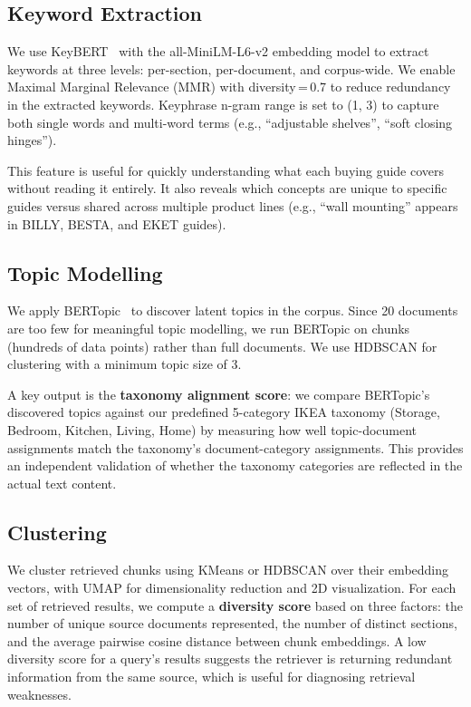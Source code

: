 \documentclass[conference]{IEEEtran}
\begin{document}
\subsection{Keyword Extraction}

We use KeyBERT~\cite{b6} with the all-MiniLM-L6-v2 embedding model to extract keywords at three levels: per-section, per-document, and corpus-wide. We enable Maximal Marginal Relevance (MMR) with diversity\,=\,0.7 to reduce redundancy in the extracted keywords. Keyphrase n-gram range is set to (1, 3) to capture both single words and multi-word terms (e.g., ``adjustable shelves'', ``soft closing hinges'').

This feature is useful for quickly understanding what each buying guide covers without reading it entirely. It also reveals which concepts are unique to specific guides versus shared across multiple product lines (e.g., ``wall mounting'' appears in BILLY, BESTA, and EKET guides).

\subsection{Topic Modelling}

We apply BERTopic~\cite{b5} to discover latent topics in the corpus. Since 20 documents are too few for meaningful topic modelling, we run BERTopic on chunks (hundreds of data points) rather than full documents. We use HDBSCAN for clustering with a minimum topic size of 3.

A key output is the \textbf{taxonomy alignment score}: we compare BERTopic's discovered topics against our predefined 5-category IKEA taxonomy (Storage, Bedroom, Kitchen, Living, Home) by measuring how well topic-document assignments match the taxonomy's document-category assignments. This provides an independent validation of whether the taxonomy categories are reflected in the actual text content.

\subsection{Clustering}

We cluster retrieved chunks using KMeans or HDBSCAN over their embedding vectors, with UMAP for dimensionality reduction and 2D visualization. For each set of retrieved results, we compute a \textbf{diversity score} based on three factors: the number of unique source documents represented, the number of distinct sections, and the average pairwise cosine distance between chunk embeddings. A low diversity score for a query's results suggests the retriever is returning redundant information from the same source, which is useful for diagnosing retrieval weaknesses.
\end{document}
